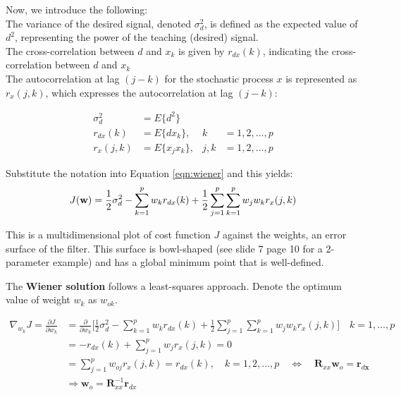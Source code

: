 Now, we introduce the following:\\

The variance of the desired signal, denoted \(\sigma_d^2\), is defined as the expected value of \(d^2\), representing the power of the teaching (desired) signal.\\ 

The cross-correlation between \(d\) and \(x_k\) is given by \(r_{dx}(k)\), indicating the cross-correlation between \(d\) and \(x_k\)\\

The autocorrelation at lag \((j - k)\) for the stochastic process \(x\) is represented as \(r_x(j, k)\), which expresses the autocorrelation at lag \((j - k)\):

\begin{align*}
\sigma_d^2 &= E\{d^2\} \\
r_{dx}(k) &= E\{dx_k\}, & k &= 1, 2, \ldots, p \\
r_x(j, k) &= E\{x_jx_k\}, & j, k &= 1, 2, \ldots, p
\end{align*}


Substitute the notation into Equation \ref{eqn:wiener} and this yields:
\begin{align}
    J(\mathbf{w})=\frac12\sigma_d^2-\sum_{k=1}^pw_kr_{dx}(k)+\frac12\sum_{j=1}^p\sum_{k=1}^pw_jw_kr_x(j,k)
\end{align}

This is a multidimensional plot of cost function $J$ against the weights, an error surface of the filter. This surface is bowl-shaped (see slide 7 page 10 for a 2-parameter example) and has a global minimum point that is well-defined. 

The \textbf{Wiener solution} follows a least-squares approach. Denote the optimum value of weight $w_k$ as $w_{ok}$.

\begin{align}
    \nabla_{w_k}J=\frac{\partial J}{\partial w_k}&=\frac\partial{\partial w_k}\Big[\frac12\sigma_d^2-\sum_{k=1}^pw_kr_{dx}(k)+\frac12\sum_{j=1}^p\sum_{k=1}^pw_jw_kr_x(j,k)\Big]\quad k=1,\ldots,p\\
    &=-r_{dx}(k)+\sum_{j=1}^pw_jr_x(j,k)=0\\
    &=\sum_{j=1}^pw_{oj}r_x(j,k)=r_{dx}(k),\quad k=1,2,\ldots,p\quad\Leftrightarrow\quad\mathbf{R}_{xx}\mathbf{w}_o=\mathbf{r}_{d\mathbf{x}}\\
    &\Rightarrow \mathbf{w}_o=\mathbf{R}_{xx}^{-1}\mathbf{r}_{dx}
\end{align}

